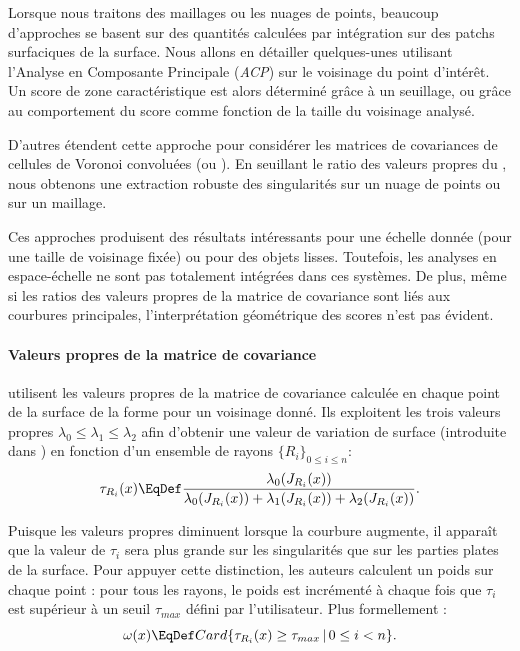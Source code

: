 Lorsque nous traitons des maillages ou les nuages de points, beaucoup
d'approches se basent sur des quantités calculées par intégration sur des patchs
surfaciques de la surface. Nous allons en détailler quelques-unes
\cite{Pauly2003,Telea2004} utilisant l'Analyse en Composante Principale
(\emph{ACP}) sur le voisinage du point d’intérêt. Un score de zone
caractéristique est alors déterminé grâce à un seuillage, ou grâce au
comportement du score comme fonction de la taille du voisinage analysé.

D'autres \cite{Merigot2011} étendent cette approche pour considérer les matrices
de covariances de cellules de Voronoi convoluées (\VCMM ou \VCM). En seuillant
le ratio des valeurs propres du \VCM, nous obtenons une extraction robuste des
singularités sur un nuage de points ou sur un maillage.

Ces approches produisent des résultats intéressants pour une échelle donnée
(pour une taille de voisinage fixée) ou pour des objets lisses. Toutefois, les
analyses en espace-échelle ne sont pas totalement intégrées dans ces systèmes.
De plus, même si les ratios des valeurs propres de la matrice de covariance sont
liés aux courbures principales, l'interprétation géométrique des scores n'est pas
évident.

\paragraph{Valeurs propres de la matrice de covariance}

 utilisent les valeurs propres de la matrice de
covariance calculée en chaque point de la surface de la forme pour un voisinage
donné. Ils exploitent les trois valeurs propres $\lambda_0 \leq \lambda_1 \leq
\lambda_2$ afin d'obtenir une valeur de variation de surface (introduite dans
\cite{Pauly2002}) en fonction d'un ensemble de rayons $\{ R_i \}_{0 \le i \le n}$:
\begin{equation}
  \tau_{R_i}(x) \EqDef \frac{\lambda_0(J_{R_i}(x))}{\lambda_0(J_{R_i}(x)) + \lambda_1(J_{R_i}(x)) + \lambda_2(J_{R_i}(x))} \text{.}
\end{equation}

Puisque les valeurs propres diminuent lorsque la courbure augmente, il apparaît
que la valeur de $\tau_i$ sera plus grande sur les singularités que sur les parties
plates de la surface. Pour appuyer cette distinction, les auteurs calculent un
poids sur chaque point : pour tous les rayons, le poids est incrémenté à chaque
fois que $\tau_i$ est supérieur à un seuil $\tau_{max}$ défini par
l'utilisateur. Plus formellement :
\begin{equation}
  \omega(x) \EqDef Card \{ \tau_{R_i}(x) \geq \tau_{max}\,|\,0\leq i < n \} \text{.}
\end{equation}

